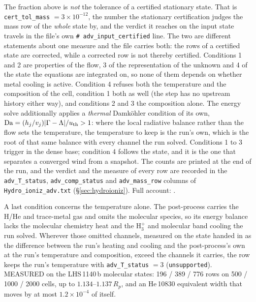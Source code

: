 \documentclass[english,a4paper]{my_memo}
\begin{document}
\noindent The fraction above is \emph{not} the tolerance of a certified stationary state.
That is \texttt{cert\_tol\_mass} $=3\times10^{-12}$, the number the stationary
certification judges the mass row of the \emph{whole} state by, and the verdict it reaches
on the input state travels in the file's own \texttt{\# adv\_input\_certified} line. The two
are different statements about one measure and the file carries both: the rows of a
certified state are corrected, while a corrected row is not thereby certified.
Conditions 1 and 2 are properties of the flow, 3 of the representation of the unknown and
4 of the state the equations are integrated on, so none of them depends on whether metal
cooling is active. Condition 4 refuses both the temperature and the composition of the
cell, condition 1 both as well (the step has no upstream history either way), and
conditions 2 and 3 the composition alone. The energy solve additionally applies a
\emph{thermal} Damk\"ohler condition of its own,
${\rm Da} = (h_j/v_j)|\Gamma-\Lambda|/u_{\rm th} > 1$: where the local radiative balance
rather than the flow sets the temperature, the temperature to keep is the run's own, which
is the root of that same balance with every channel the run solved. Conditions 1 to 3
trigger in the dense base; condition 4 follows the state, and it is the one that separates
a converged wind from a snapshot. The counts are printed at the end of the run, and the
verdict and the measure of every row are recorded in the \texttt{adv\_T\_status},
\texttt{adv\_comp\_status} and \texttt{adv\_mass\_row} columns of
\texttt{Hydro\_ioniz\_adv.txt} (\S\ref{sec:hydroioniz}). Full account:
.

A last condition concerns the temperature alone. The post-process carries the
H/He and trace-metal gas and omits the molecular species, so its energy
balance lacks the molecular chemistry heat and the H$_3^+$ and molecular band
cooling the run solved. Wherever those omitted channels, measured on the state
handed in as the difference between the run's heating and cooling and the
post-process's own at the run's temperature and composition, exceed the
channels it carries, the row keeps the run's temperature with
\texttt{adv\_T\_status} $=3$ (\texttt{unsupported}). MEASURED on the
LHS\,1140\,b molecular states: 196 / 389 / 776 rows on 500 / 1000 / 2000
cells, up to $1.134$--$1.137\,R_p$, and an He\,10830 equivalent width that
moves by at most $1.2\times10^{-4}$ of itself.
\end{document}
